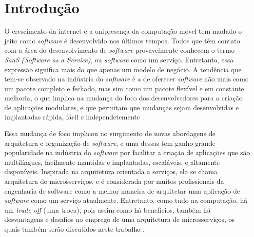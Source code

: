 \chapter{Introdução}\label{chapter-introducao}

O crescimento da internet e a onipresença da computação móvel tem mudado o jeito como \emph{software} é desenvolvido nos últimos tempos. Todos que têm contato com a área do desenvolvimento de \emph{software} provavelmente conhecem o termo \emph{SaaS (Software as a Service)}, ou \emph{software} como um serviço. Entretanto, essa expressão significa mais do que apenas um modelo de negócio. A tendência que tem-se observado na indústria do \emph{software} é a de oferecer \emph{software} não mais como um pacote completo e fechado, mas sim como um pacote flexível e em constante melhoria, o que implica na mudança do foco dos desenvolvedores para a criação de aplicações modulares, e que permitam que mudanças sejam desenvolvidas e implantadas rápida, fácil e independetemente \cite{CAOPLE, oracle_microservices}.

Essa mudança de foco implicou no surgimento de novas abordagens de arquitetura e organização de \emph{software}, e uma dessas tem ganho grande popularidade na indústria do \emph{software} por facilitar a criação de aplicações que são multilíngues, facilmente mantidas e implantadas, escaláveis, e altamente disponíveis. Inspirada na arquitetura orientada a serviços, ela se chama arquitetura de microsserviços, e é considerada por muitos profissionais da engenharia de software como a melhor maneira de arquitetar uma aplicação de \emph{software} como um serviço atualmente. Entretanto, como tudo na computação, há um \emph{trade-off} (uma troca), pois assim como há benefícios, também há desvantagens e desafios no emprego de uma arquitetura de microsserviços, os quais também serão discutidos neste trabalho \cite{middleware-microservices,design-monitoring-testing-waseem}.




